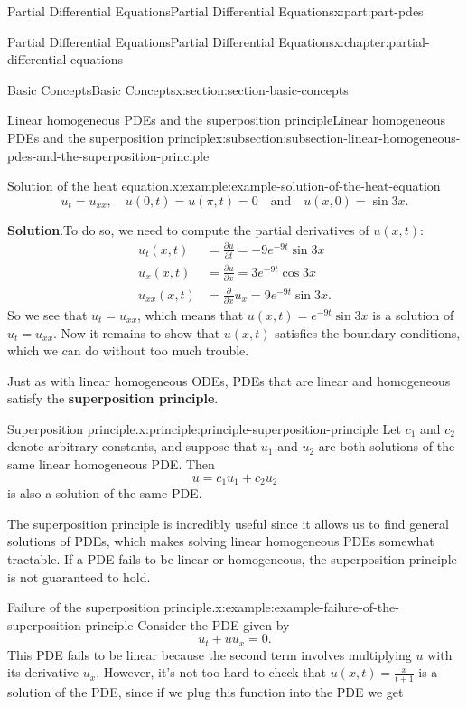 \documentclass[oneside,10pt,]{book}
\newcommand{\blocktitlefont}{\relax}
\newcommand{\terminology}[1]{\textbf{#1}}
\numberwithin{equation}{part}
\newcommand{\amp}{&}
\begin{document}
\begin{partptx}{Partial Differential Equations}{}{Partial Differential Equations}{}{}{x:part:part-pdes}
\begin{chapterptx}{Partial Differential Equations}{}{Partial Differential Equations}{}{}{x:chapter:partial-differential-equations}
\begin{sectionptx}{Basic Concepts}{}{Basic Concepts}{}{}{x:section:section-basic-concepts}
\begin{subsectionptx}{Linear homogeneous PDEs and the superposition principle}{}{Linear homogeneous PDEs and the superposition principle}{}{}{x:subsection:subsection-linear-homogeneous-pdes-and-the-superposition-principle}
\begin{example}{Solution of the heat equation.}{x:example:example-solution-of-the-heat-equation}
\begin{equation*}
u_{t} = u_{xx},\quad u(0,t) = u(\pi,t) = 0\quad\text{and}\quad u(x,0) = \sin3x.
\end{equation*}
%
\par\smallskip%
\noindent\textbf{\blocktitlefont Solution}.\hypertarget{g:solution:idp105548780785056}{}\quad{}To do so, we need to compute the partial derivatives of \(u(x,t):\)%
%
\begin{align*}
u_{t}(x,t) \amp = \frac{\partial u}{\partial t} = -9e^{-9t}\sin3x \\
u_{x}(x,t) \amp = \frac{\partial u}{\partial x} = 3e^{-9t}\cos3x \\
u_{xx}(x,t) \amp = \frac{\partial}{\partial x}u_{x} = 9e^{-9t}\sin3x \text{.}
\end{align*}
So we see that \(u_{t} = u_{xx}\), which means that \(u(x,t) = e^{-9t}\sin3x\) is a solution of \(u_{t} = u_{xx}\). Now it remains to show that \(u(x,t)\) satisfies the boundary conditions, which we can do without too much trouble.%
\end{example}
Just as with linear homogeneous ODEs, PDEs that are linear and homogeneous satisfy the \terminology{superposition principle}.%
\begin{principle}{Superposition principle.}{}{x:principle:principle-superposition-principle}%
%
Let \(c_{1}\) and \(c_{2}\) denote arbitrary constants, and suppose that \(u_{1}\) and \(u_{2}\) are both solutions of the same linear homogeneous PDE. Then%
\begin{equation*}
u = c_{1}u_{1}+c_{2}u_{2}
\end{equation*}
is also a solution of the same PDE.%
\end{principle}
The superposition principle is incredibly useful since it allows us to find general solutions of PDEs, which makes solving linear homogeneous PDEs somewhat tractable. If a PDE fails to be linear or homogeneous, the superposition principle is not guaranteed to hold.%
\begin{example}{Failure of the superposition principle.}{x:example:example-failure-of-the-superposition-principle}%
Consider the PDE given by%
\begin{equation*}
u_{t}+uu_{x} = 0.
\end{equation*}
This PDE fails to be linear because the second term involves multiplying \(u\) with its derivative \(u_{x}\). However, it's not too hard to check that \(u(x,t) = \frac{x}{t+1}\) is a solution of the PDE, since if we plug this function into the PDE we get%

\end{example}
\end{subsectionptx}
\end{sectionptx}
\end{chapterptx}
\end{partptx}
\end{document}
